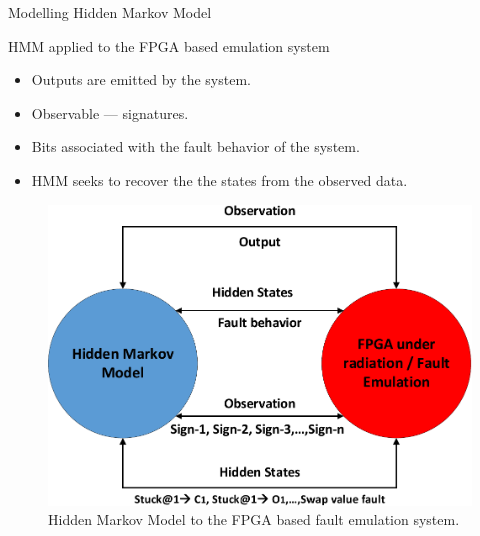\documentclass[aspectratio=1610]{beamer}
\begin{document}
\begin{frame}{Modelling Hidden Markov Model}

\begin{block}{HMM applied to the FPGA based emulation system}

\end{block}

\begin{itemize}

\item Outputs are emitted by the system.
\item Observable --- signatures.
\item Bits associated with the fault behavior of the system.
\item HMM seeks to recover the the states from the observed data.



\end{itemize}




\begin{figure}[tb!]
 \centering
  \captionsetup{justification=centering}    
   \includegraphics[scale=0.33]{Figures/HMM-air.pdf}
   \caption{Hidden Markov Model to the FPGA based fault emulation system.}
\label{fig:HMM-air}
\end{figure}
\end{frame}
\end{document}
